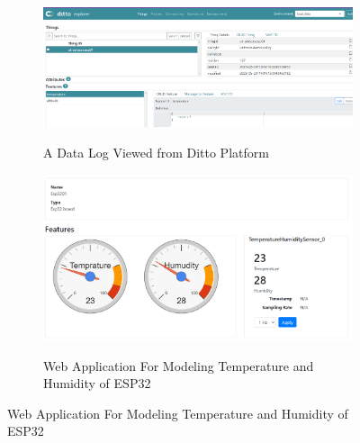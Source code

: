 \begin{figure}[H]
    \caption{Ditto and Webapp Toward Simulating Digital Twin}
    \label{fig:ditto-app}
    \begin{subfigure}[c]{1\linewidth}
        \caption{A Data Log Viewed from Ditto Platform}
        \centering
        \includegraphics[width=\linewidth]{images/fp/ditto-log.png}
        \label{fig:ditto-log}
    \end{subfigure}
    
    \begin{subfigure}[c]{1\linewidth}
        \centering
        \caption{Web Application For Modeling Temperature and Humidity of ESP32}
        \includegraphics[width=\linewidth]{images/fp/appgauge.png}
        \label{fig:appdt}
     \end{subfigure}    
\end{figure}